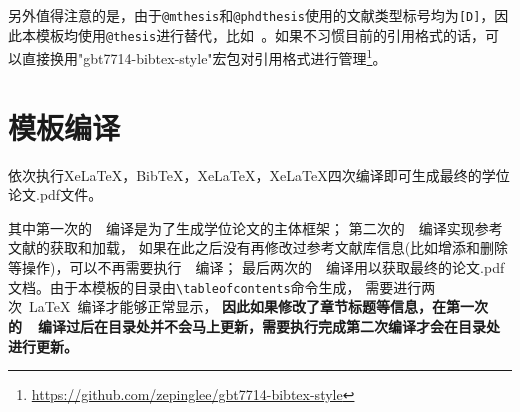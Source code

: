 另外值得注意的是，由于\verb|@mthesis|和\verb|@phdthesis|使用的文献类型标号均为\verb|[D]|，因此本模板均使用\verb|@thesis|进行替代，比如~\cite{徐泽楷2019}。如果不习惯目前的引用格式的话，可以直接换用"gbt7714-bibtex-style"宏包对引用格式进行管理\footnote{\url{https://github.com/zepinglee/gbt7714-bibtex-style}}。

\section{模板编译}
依次执行XeLaTeX，BibTeX，XeLaTeX，XeLaTeX四次编译即可生成最终的学位论文.pdf文件。

\par
其中第一次的~\XeLaTeX{}~编译是为了生成学位论文的主体框架；
第二次的~\BibTeX{}~编译实现参考文献的获取和加载，
如果在此之后没有再修改过参考文献库信息(比如增添和删除等操作)，可以不再需要执行~\BibTeX{}~编译；
最后两次的~\XeLaTeX{}~编译用以获取最终的论文.pdf文档。由于本模板的目录由\verb|\tableofcontents|命令生成，
需要进行两次~\LaTeX~编译才能够正常显示，
\textbf{因此如果修改了章节标题等信息，在第一次的~\XeLaTeX{}~编译过后在目录处并不会马上更新，需要执行完成第二次编译才会在目录处进行更新。}
